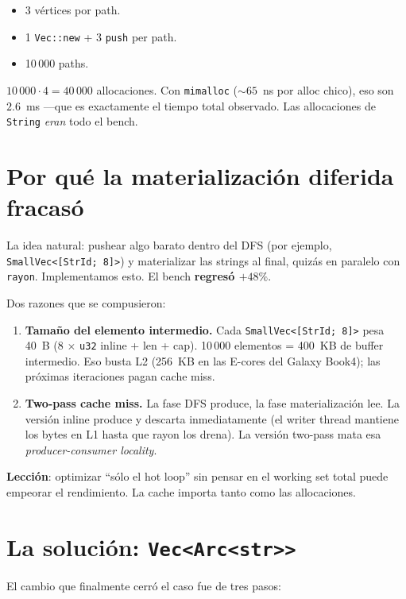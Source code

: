 \begin{itemize}
    \item 3 vértices por path.
    \item 1 \texttt{Vec::new} + 3 \texttt{push} per path.
    \item 10\,000 paths.
\end{itemize}

\noindent
\(10\,000 \cdot 4 = 40\,000\) allocaciones. Con \texttt{mimalloc}
(\(\sim 65\)~ns por alloc chico), eso son \(2.6\)~ms ---que es
exactamente el tiempo total observado. Las allocaciones de
\texttt{String} \emph{eran} todo el bench.

\section{Por qué la materialización diferida fracasó}

La idea natural: pushear algo barato dentro del DFS (por ejemplo,
\texttt{SmallVec<[StrId; 8]>}) y materializar las strings al final,
quizás en paralelo con \texttt{rayon}. Implementamos esto. El bench
\textbf{regresó \(+48\%\)}.

Dos razones que se compusieron:

\begin{enumerate}
    \item \textbf{Tamaño del elemento intermedio.} Cada
    \texttt{SmallVec<[StrId; 8]>} pesa 40~B
    (8 \(\times\) \texttt{u32} inline + len + cap). 10\,000
    elementos = 400~KB de buffer intermedio. Eso busta L2 (256~KB
    en las E-cores del Galaxy Book4); las próximas iteraciones
    pagan cache miss.
    \item \textbf{Two-pass cache miss.} La fase DFS produce, la
    fase materialización lee. La versión inline produce y descarta
    inmediatamente (el writer thread mantiene los bytes en L1
    hasta que rayon los drena). La versión two-pass mata esa
    \emph{producer-consumer locality}.
\end{enumerate}

\noindent
\textbf{Lección}: optimizar ``sólo el hot loop'' sin pensar en el
working set total puede empeorar el rendimiento. La cache importa
tanto como las allocaciones.

\section{La solución: \texttt{Vec<Arc<str>>}}

El cambio que finalmente cerró el caso fue de tres pasos:

